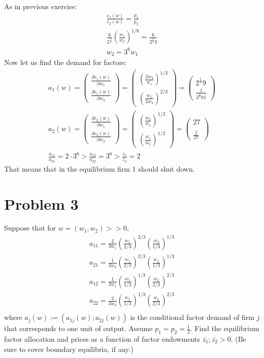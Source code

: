 \documentclass[a4paper]{article}
\begin{document}
As in previous exercise:
\begin{align*}
\frac{c_1(w)}{c_2(w)} = \frac{p_1}{p_2}\\ \frac{6}{2^{\frac{2}{3}}}\left(\frac{w_1}{w_2}\right)^{1/6} = \frac{6}{2^{\frac{2}{3}}3}\\
w_2 = 3^6w_1
\end{align*}
Now let us find the demand for factors:
\begin{align*}
a_1(w) = \begin{pmatrix}
\frac{\partial c_1(w)}{\partial w_1}\\
\frac{\partial c_1(w)}{\partial w_2}
\end{pmatrix} = \begin{pmatrix}
\left(\frac{2w_2}{w_1}\right)^{1/3}\\
\left(\frac{w_1}{2w_2}\right)^{2/3}
\end{pmatrix} = \begin{pmatrix}
2^{\frac{1}{3}}9\\
\frac{1}{2^{\frac{2}{3}}81}
\end{pmatrix}\\
a_2(w) = \begin{pmatrix}
\frac{\partial c_2(w)}{\partial w_1}\\
\frac{\partial c_2(w)}{\partial w_2}
\end{pmatrix} = \begin{pmatrix}
\left(\frac{w_2}{w_1}\right)^{1/2}\\
\left(\frac{w_1}{w_2}\right)^{1/2}
\end{pmatrix} = \begin{pmatrix}
27\\
\\
\frac{1}{27}
\end{pmatrix}\\
\frac{a_{11}}{a_{21}} = 2\cdot 3^6 > \frac{a_{12}}{a_{22}} = 3^6 > \frac{\bar{z_1}}{\bar{z_2}} = 2
\end{align*}
That means that in the equilibrium firm 1 should shut down.

\section*{Problem 3}
Suppose that for $w = (w_1, w_2) >> 0$, \begin{align*}
a_{11} = \frac{2}{3w_1}\left(\frac{w_1}{2/3}\right)^{2/3}\left(\frac{w_2}{1/3}\right)^{1/3}\\
a_{21} = \frac{1}{3w_2}\left(\frac{w_1}{2/3}\right)^{2/3}\left(\frac{w_2}{1/3}\right)^{1/3}\\
a_{12} = \frac{1}{3w_1}\left(\frac{w_1}{1/3}\right)^{1/3}\left(\frac{w_2}{2/3}\right)^{2/3}\\
a_{22} = \frac{2}{3w_2}\left(\frac{w_1}{1/3}\right)^{1/3}\left(\frac{w_2}{2/3}\right)^{2/3}\\
\end{align*}
where $a_j(w) := (a_{1j}(w); a_{2j}(w))$ is the conditional factor demand of firm $j$ that corresponds
to one unit of output. Assume $p_1 = p_2 = \frac{1}{2}$. Find the equilibrium factor allocation and
prices as a function of factor endowments $\bar{z_1}; \bar{z_2} > 0$. (Be sure to cover boundary equilibria,
if any.)
\end{document}
